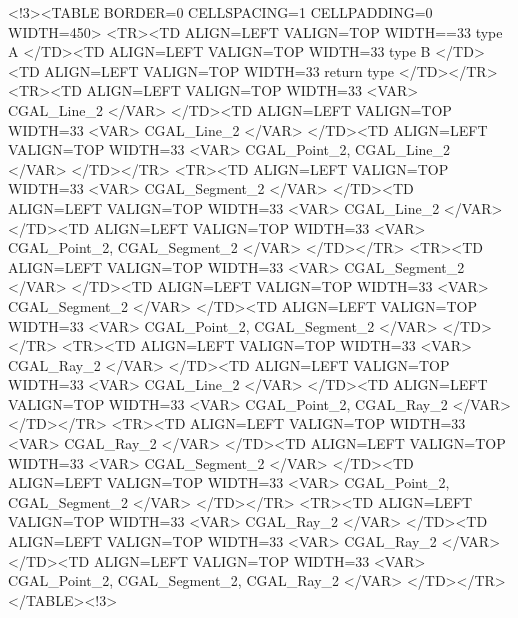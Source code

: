 \begin{HtmlOnly}
        <!3><TABLE BORDER=0 CELLSPACING=1 CELLPADDING=0 WIDTH=450>
        <TR><TD ALIGN=LEFT VALIGN=TOP WIDTH==33%
     type A
        </TD><TD ALIGN=LEFT VALIGN=TOP WIDTH=33%
     type B
        </TD><TD ALIGN=LEFT VALIGN=TOP WIDTH=33%
     return type
        </TD></TR>
        <TR><TD ALIGN=LEFT VALIGN=TOP WIDTH=33%
        <VAR>
    CGAL_Line_2
        </VAR>
        </TD><TD ALIGN=LEFT VALIGN=TOP WIDTH=33%
        <VAR>
     CGAL_Line_2
        </VAR>
        </TD><TD ALIGN=LEFT VALIGN=TOP WIDTH=33%
        <VAR>
     CGAL_Point_2, CGAL_Line_2
        </VAR>
        </TD></TR>
        <TR><TD ALIGN=LEFT VALIGN=TOP WIDTH=33%
        <VAR>
    CGAL_Segment_2
        </VAR>
        </TD><TD ALIGN=LEFT VALIGN=TOP WIDTH=33%
        <VAR>
     CGAL_Line_2
        </VAR>
        </TD><TD ALIGN=LEFT VALIGN=TOP WIDTH=33%
        <VAR>
     CGAL_Point_2, CGAL_Segment_2
        </VAR>
        </TD></TR>
        <TR><TD ALIGN=LEFT VALIGN=TOP WIDTH=33%
        <VAR>
    CGAL_Segment_2
        </VAR>
        </TD><TD ALIGN=LEFT VALIGN=TOP WIDTH=33%
        <VAR>
     CGAL_Segment_2
        </VAR>
        </TD><TD ALIGN=LEFT VALIGN=TOP WIDTH=33%
        <VAR>
     CGAL_Point_2, CGAL_Segment_2
        </VAR>
        </TD></TR>
        <TR><TD ALIGN=LEFT VALIGN=TOP WIDTH=33%
        <VAR>
    CGAL_Ray_2
        </VAR>
        </TD><TD ALIGN=LEFT VALIGN=TOP WIDTH=33%
        <VAR>
     CGAL_Line_2
        </VAR>
        </TD><TD ALIGN=LEFT VALIGN=TOP WIDTH=33%
        <VAR>
     CGAL_Point_2, CGAL_Ray_2
        </VAR>
        </TD></TR>
        <TR><TD ALIGN=LEFT VALIGN=TOP WIDTH=33%
        <VAR>
    CGAL_Ray_2
        </VAR>
        </TD><TD ALIGN=LEFT VALIGN=TOP WIDTH=33%
        <VAR>
     CGAL_Segment_2
        </VAR>
        </TD><TD ALIGN=LEFT VALIGN=TOP WIDTH=33%
        <VAR>
     CGAL_Point_2, CGAL_Segment_2
        </VAR>
        </TD></TR>
        <TR><TD ALIGN=LEFT VALIGN=TOP WIDTH=33%
        <VAR>
    CGAL_Ray_2
        </VAR>
        </TD><TD ALIGN=LEFT VALIGN=TOP WIDTH=33%
        <VAR>
     CGAL_Ray_2
        </VAR>
        </TD><TD ALIGN=LEFT VALIGN=TOP WIDTH=33%
        <VAR>
     CGAL_Point_2, CGAL_Segment_2, CGAL_Ray_2
        </VAR>
        </TD></TR>
        </TABLE><!3>
\end{HtmlOnly}


